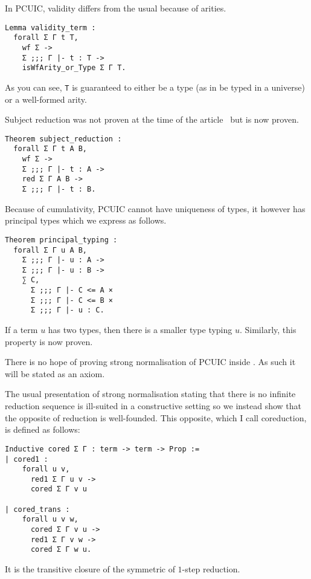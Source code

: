 
In \acrshort{PCUIC}, validity differs from the usual because of arities.
\begin{verbatim}
Lemma validity_term :
  forall Σ Γ t T,
    wf Σ ->
    Σ ;;; Γ |- t : T ->
    isWfArity_or_Type Σ Γ T.
\end{verbatim}
As you can see, \texttt{T} is guaranteed to either be a type (as in
be typed in a universe) or a well-formed arity.


Subject reduction was not proven at the time of the
article~ but is now proven.
\begin{verbatim}
Theorem subject_reduction :
  forall Σ Γ t A B,
    wf Σ ->
    Σ ;;; Γ |- t : A ->
    red Σ Γ A B ->
    Σ ;;; Γ |- t : B.
\end{verbatim}


Because of cumulativity, \acrshort{PCUIC} cannot have uniqueness of types, it
however has principal types which we express as follows.
\begin{verbatim}
Theorem principal_typing :
  forall Σ Γ u A B,
    Σ ;;; Γ |- u : A ->
    Σ ;;; Γ |- u : B ->
    ∑ C,
      Σ ;;; Γ |- C <= A ×
      Σ ;;; Γ |- C <= B ×
      Σ ;;; Γ |- u : C.
\end{verbatim}
If a term \(u\) has two types, then there is a smaller type typing \(u\).
Similarly, this property is now proven.


There is no hope of proving strong normalisation of \acrshort{PCUIC} inside
\Coq. As such it will be stated as an axiom.

The usual presentation of strong normalisation stating that there is no infinite
reduction sequence is ill-suited in a constructive setting so we instead show
that the opposite of reduction is well-founded.
This opposite, which I call coreduction, is defined as follows:
\begin{verbatim}
Inductive cored Σ Γ : term -> term -> Prop :=
| cored1 :
    forall u v,
      red1 Σ Γ u v ->
      cored Σ Γ v u

| cored_trans :
    forall u v w,
      cored Σ Γ v u ->
      red1 Σ Γ v w ->
      cored Σ Γ w u.
\end{verbatim}
It is the transitive closure of the symmetric of \(1\)-step reduction.


